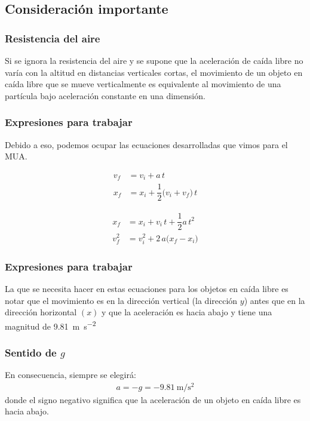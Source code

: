 \documentclass[14pt]{beamer}
\begin{document}
\subsection{Consideración importante}

\begin{frame}
\frametitle{Resistencia del aire}
Si se ignora la resistencia del aire \pause y se supone que la aceleración de caída libre no varía con la altitud en distancias verticales cortas, \pause el movimiento de un objeto en caída libre que se mueve verticalmente es equivalente al movimiento de una partícula bajo aceleración constante en una dimensión.
\end{frame}
\begin{frame}
\frametitle{Expresiones para trabajar}
Debido a eso, podemos ocupar las ecuaciones desarrolladas que vimos para el MUA.
\pause
\begin{minipage}{0.4\linewidth}
\begin{align*}
v_{f} &= v_{i} + a \, t \\[0.5em]
x_{f} &= x_{i} + \dfrac{1}{2} \big( v_{i} + v_{f} \big) \, t
\end{align*}
\end{minipage}
\hspace{1cm}
\begin{minipage}{0.4\linewidth}
\begin{align*}
x_{f} &= x_{i} + v_{i} \, t + \dfrac{1}{2} a \, t^{2} \\[0.5em]
v_{f}^{2} &= v_{i}^{2} + 2 \, a \big( x_{f} - x_{i}\big)
\end{align*}
\end{minipage}
\end{frame}
\begin{frame}
\frametitle{Expresiones para trabajar}
La  que se necesita hacer en estas ecuaciones para los objetos en caída libre es notar que el movimiento es en la dirección vertical (la dirección $y$) \pause antes que en la dirección horizontal $(x)$ \pause y que la aceleración es hacia abajo y tiene una magnitud de \SI{9.81}{\meter\per\square\second}
\end{frame}
\begin{frame}
\frametitle{Sentido de $g$}
En consecuencia, \pause siempre se elegirá:
\pause
\begin{align*}
a = - g = - \SI{9.81}{\meter\per\square\second}
\end{align*}
donde el signo negativo significa que la aceleración de un objeto en caída libre es hacia abajo.
\end{frame}
\end{document}
